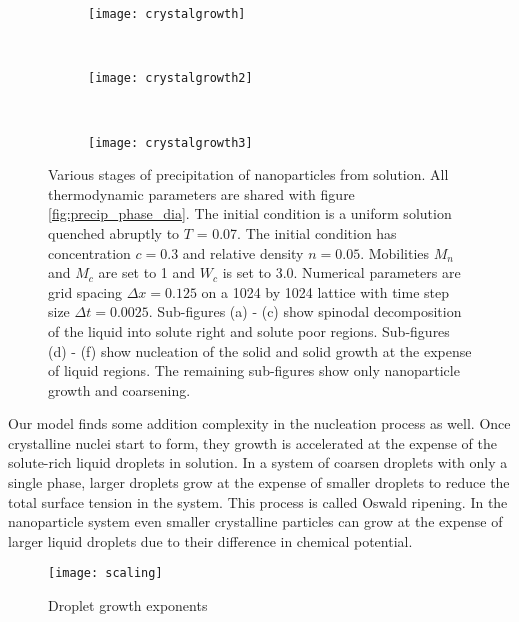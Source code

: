 \begin{figure}
    \vspace{0.25cm}
    \begin{subfigure}[b]{0.3\textwidth}
        \texttt{[image: crystalgrowth]}
        \label{fig:crystalgrowth}
        \caption{}
    \end{subfigure}
    ~
    \begin{subfigure}[b]{0.3\textwidth}
        \texttt{[image: crystalgrowth2]}
        \label{fig:crystalgrowth2}
        \caption{}
    \end{subfigure}
    ~ 
    \begin{subfigure}[b]{0.3\textwidth}
        \texttt{[image: crystalgrowth3]}
        \label{fig:crystalgrowth3}
        \caption{}
    \end{subfigure}
    \caption[Stages of precipitation of nanoparticles from solution]{
        \label{fig:precipitation}
        Various stages of precipitation of nanoparticles from solution. All
        thermodynamic parameters are shared with figure
        \ref{fig:precip_phase_dia}. The initial condition is a uniform solution
        quenched abruptly to $T$ = 0.07. The initial condition has
        concentration $c = 0.3$ and relative density $n = 0.05$. Mobilities
        $M_n$ and $M_c$ are set to 1 and $W_c$ is set to 3.0. Numerical
        parameters are grid spacing $\Delta x = 0.125$ on a 1024 by 1024
        lattice with time step size $\Delta t = 0.0025$. Sub-figures (a) - (c)
        show spinodal decomposition of the liquid into solute right and solute
        poor regions. Sub-figures (d) - (f) show nucleation of the solid and
        solid growth at the expense of liquid regions.  The remaining
        sub-figures show only nanoparticle growth and coarsening.
    }
\end{figure}

Our model finds some addition complexity in the nucleation process as well.
Once crystalline nuclei start to form, they growth is accelerated at the
expense of the solute-rich liquid droplets in solution. In a system of coarsen
droplets with only a single phase, larger droplets grow at the expense of
smaller droplets to reduce the total surface tension in the system. This
process is called Oswald ripening. In the nanoparticle system even smaller
crystalline particles can grow at the expense of larger liquid droplets due to
their difference in chemical potential.

\begin{figure}
    \centering
    \texttt{[image: scaling]}
    \caption{
        \label{fig:scaling}
        Droplet growth exponents
    }
\end{figure}

